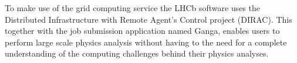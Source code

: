 
To make use of the grid computing service the LHCb software uses the Distributed Infrastructure with Remote Agent's Control project (DIRAC). This together with the job submission application named Ganga, enables users to perform large scale physics analysis without having to the need for a complete understanding of the computing challenges behind their physics analyses.

